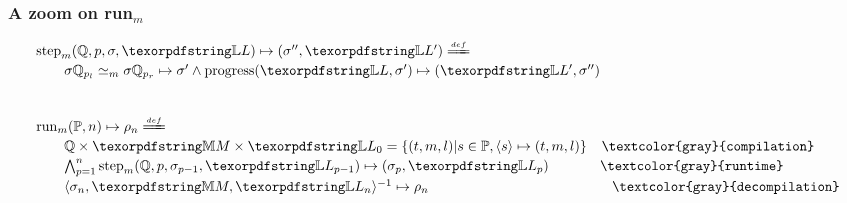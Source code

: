 \documentclass{pres}
\begin{document}
\begin{frame}[fragile]
  \frametitle{A zoom on run$_m$}

  $$
  \begin{array}{l}
    \stepH{\hoUnifPb}{p}{\sigma}{\linkStore}{\sigma''}{\linkStore'} \deff\vspace{2pt}\\
      \qquad\stepHD{\hoUnifPb}{p}{\sigma}{\sigma'}{\sigma''}{\linkStore}\vspace{2pt}\\\\\\
    \runH{\foUnifPb}{n}{\rho} \deff \vspace{2pt}\\
      \qquad \hoUnifPb \times \mapStore \times \linkStore_0 = \{ (t,m,l) | s \in \foUnifPb, \C{s}{t}{m}{l} \}\vspace{2pt} \texttt{\phantom{ss}\textcolor{gray}{compilation}}\\
      \qquad \runHD{\hoUnifPb}{n}{\linkStore}\vspace{2pt} \texttt{\phantom{aaaaass}\textcolor{gray}{runtime}}\\
      \qquad \D{\sigma_{n}}{\mapStore}{\linkStore_{n}}{\rho_{n}} \texttt{\phantom{aaaaaaaaaaaaaaaaaassaaaa} \textcolor{gray}{decompilation}}
    \end{array}
  $$    

\end{frame}
\end{document}
